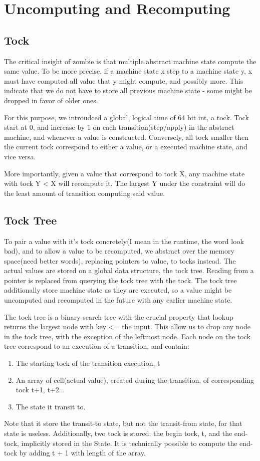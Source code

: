 \documentclass[acmsmall]{acmart}
\begin{document}
	\section{Uncomputing and Recomputing}
	\subsection{Tock}
	The critical insight of zombie is that multiple abstract machine state compute the same value. To be more precise, if a machine state x step to a machine state y, x must have computed all value that y might compute, and possibly more. This indicate that we do not have to store all previous machine state - some might be dropped in favor of older ones.
	
	For this purpose, we introudced a global, logical time of 64 bit int, a tock. Tock start at 0, and increase by 1 on each transition(step/apply) in the abstract machine, and whenever a value is constructed. Conversely, all tock smaller then the current tock correspond to either a value, or a executed machine state, and vice versa.
	
	More importantly, given a value that correspond to tock X, any machine state with tock Y < X will recompute it. The largest Y under the constraint will do the least amount of transition computing said value.
	\subsection{Tock Tree}
	To pair a value with it's tock concretely(I mean in the runtime, the word look bad), and to allow a value to be recomputed, we abstract over the memory space(need better words), replacing pointers to value, to tocks instead. The actual values are stored on a global data structure, the tock tree. Reading from a pointer is replaced from querying the tock tree with the tock. The tock tree additionally store machine state as they are executed, so a value might be uncomputed and recomputed in the future with any earlier machine state.
	
	The tock tree is a binary search tree with the crucial property that lookup returns the largest node with key <= the input. This allow us to drop any node in the tock tree, with the exception of the leftmost node. Each node on the tock tree correspond to an execution of a transition, and contain:
	\begin{enumerate}
		\item The starting tock of the transition execution, t
		\item An array of cell(actual value), created during the transition, of corresponding tock t+1, t+2...
		\item The state it transit to.
	\end{enumerate} 
	Note that it store the transit-to state, but not the transit-from state, for that state is useless. Additionally, two tock is stored: the begin tock, t, and the end-tock, implicitly stored in the State. It is technically possible to compute the end-tock by adding t + 1 with length of the array.
\end{document}
